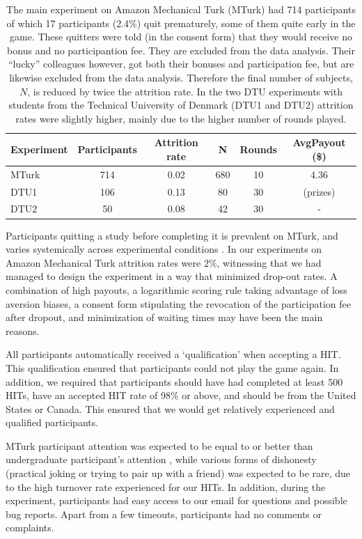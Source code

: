 \begin{table} %
\centering
\begin{tabular}{lccccc}
\hline
Experiment   &   Participants &   Attrition rate &   N & Rounds & AvgPayout  (\$) \\
\hline
 MTurk 	& 714 &  0.02 &  680 & 10 & 4.36    \\
 DTU1  	& 106 &  0.13 &  80 & 30 & (prizes)   \\
 DTU2  	&   50 &  0.08 &  42 & 30 & - \\
\hline
\end{tabular}
\caption{The main experiment on Amazon Mechanical Turk (MTurk) had 714 participants of which 17 participants (2.4\%) quit prematurely, some of them quite early in the game. These quitters were told (in the consent form) that they would receive no bonus and no participantion fee. They are excluded from the data analysis. Their ``lucky'' colleagues however, got both their bonuses and participation fee, but are likewise excluded from the data analysis. Therefore the final number of subjects, $N$, is reduced by twice the attrition rate. In the two DTU experiments with students from the Technical University of Denmark (DTU1 and DTU2) attrition rates were slightly higher, mainly due to the higher number of rounds played.}
\label{table:A1}
\end{table}

Participants quitting a study before completing it is prevalent on MTurk, and varies systemically across experimental conditions \cite{ZhouFishbach16}. In our experiments on Amazon Mechanical Turk attrition rates were $2\%$, witnessing that we had managed to design the experiment in a way that minimized drop-out rates. A combination of high payouts, a logarithmic scoring rule taking advantage of loss aversion biases, a consent form stipulating the revocation of the participation fee after dropout, and minimization of waiting times may have been the main reasons.

All participants automatically received a `qualification' when accepting a HIT. This qualification ensured that participants could not play the game again. In addition, we required that participants should have had completed at least 500 HITs, have an accepted HIT rate of 98\% or above, and should be from the United States or Canada. This ensured that we would get relatively experienced and qualified participants.

MTurk participant attention was expected to be equal to or better than undergraduate participant's attention \cite{Rand2012}, while various forms of dishonesty (practical joking or trying to pair up with a friend) was expected to be rare, due to the high turnover rate experienced for our HITs. In addition, during the experiment, participants had easy access to our email for questions and possible bug reports. Apart from a few timeouts, participants had no comments or complaints.


